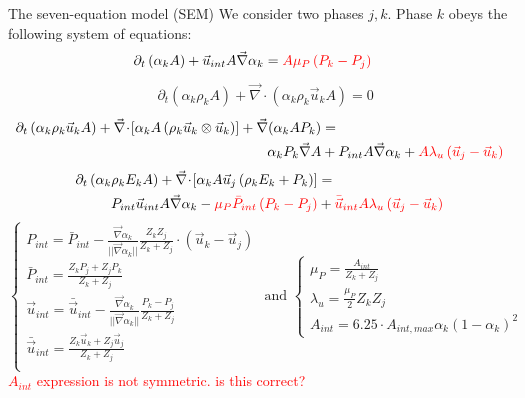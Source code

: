 \documentclass[xcolor=dvipsnames,10pt]{beamer}
\renewcommand{\div}{\vec{\nabla}\! \cdot \!}
\newcommand{\grad}{\vec{\nabla}}
\newcommand{\tcr}[1]{\textcolor{red}{#1}}
\begin{document}
\begin{frame}{The seven-equation model (SEM)}
We consider two phases ${j,k}$. Phase $k$ obeys the following system of equations:
\begin{align}
&\partial_t \left( \alpha_k  A\right) + \vec{u}_{int} A \grad \alpha_k = {\color{red}A \mu_P \left( P_k - P_j \right)} \nonumber
\end{align}
\begin{align}
&\partial_t \left( \alpha_k \rho_k A \right) + \div \left( \alpha_k \rho_k \vec{u}_k A \right) = 0 \nonumber
\end{align}
\begin{align}
\partial_t \left( \alpha_k \rho_k \vec{u}_k A \right) + \div \left[ \alpha_k A \left( \rho_k \vec{u}_k\otimes \vec{u}_k \right) \right]  + \grad(\alpha_k A P_k) &=  \nonumber \\
\alpha_k P_k \grad A &+  P_{int} A \grad \alpha_k +  {\color{red}A \lambda_u \left( \vec{u}_j - \vec{u}_k \right)} \nonumber
\end{align}
\begin{align}
\partial_t \left( \alpha_k \rho_k E_k A \right) + \div \left[ \alpha_k A \vec{u}_j \left( \rho_k E_k + P_k \right) \right] &= \nonumber\\
P_{int} \vec{u}_{int} A \grad \alpha_k - {\color{red}\mu_P \bar{P}_{int} \left( P_k-P_j \right)} &+{\color{red}\bar{\vec{u}}_{int} A \lambda_u \left( \vec{u}_j - \vec{u}_k \right)} \nonumber
\end{align}
\begin{equation}
\left\{
\begin{array}{l}
P_{int} = \bar{P}_{int} - \frac{\grad \alpha_k}{||\grad \alpha_k||} \frac{Z_k Z_j}{Z_k + Z_j} \cdot \left( \vec{u}_k-\vec{u}_j \right) \\
\bar{P}_{int} = \frac{Z_k P_j + Z_j P_k}{Z_k + Z_j} \\
\vec{u}_{int} = \bar{\vec{u}}_{int} - \frac{\grad \alpha_k}{||\grad \alpha_k||} \frac{P_k - P_j}{Z_k + Z_j} \\
\bar{\vec{u}}_{int} = \frac{Z_k \vec{u} _k + Z_j \vec{u}_j}{Z_k + Z_j} \\
\end{array}
\right.
\nonumber
\text{ and }
\left\{
\begin{array}{l}
\mu_P = \frac{A_{int}}{Z_k+Z_j} \\
\lambda_u = \frac{\mu_P}{2} Z_k Z_j \\
A_{int} = 6.25 \cdot A_{int,max} \alpha_k \left( 1-\alpha_k \right)^2
\end{array}
\right.
\end{equation}
\tcr{$A_{int}$ expression is not symmetric. is this correct?}
\end{frame}
\end{document}
